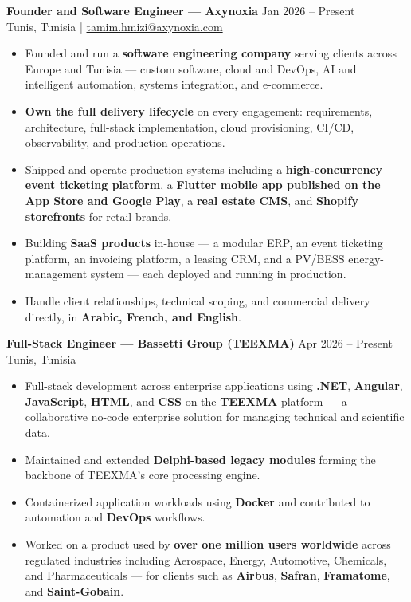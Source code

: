 \documentclass[10pt, letterpaper]{article}
\newenvironment{highlights}{
\begin{itemize}[leftmargin=12pt, itemsep=2pt]
}{
\end{itemize}
}
\begin{document}
\textbf{Founder and Software Engineer --- Axynoxia} \hfill Jan 2026 -- Present \\
Tunis, Tunisia \;|\; \href{mailto:tamim.hmizi@axynoxia.com}{tamim.hmizi@axynoxia.com}
\begin{highlights}
\item Founded and run a \textbf{software engineering company} serving clients across Europe and Tunisia --- custom software, cloud and DevOps, AI and intelligent automation, systems integration, and e-commerce.
\item \textbf{Own the full delivery lifecycle} on every engagement: requirements, architecture, full-stack implementation, cloud provisioning, CI/CD, observability, and production operations.
\item Shipped and operate production systems including a \textbf{high-concurrency event ticketing platform}, a \textbf{Flutter mobile app published on the App Store and Google Play}, a \textbf{real estate CMS}, and \textbf{Shopify storefronts} for retail brands.
\item Building \textbf{SaaS products} in-house --- a modular ERP, an event ticketing platform, an invoicing platform, a leasing CRM, and a PV/BESS energy-management system --- each deployed and running in production.
\item Handle client relationships, technical scoping, and commercial delivery directly, in \textbf{Arabic, French, and English}.
\end{highlights}

\textbf{Full-Stack Engineer --- Bassetti Group (TEEXMA)} \hfill Apr 2026 -- Present \\
Tunis, Tunisia
\begin{highlights}
\item Full-stack development across enterprise applications using \textbf{.NET}, \textbf{Angular}, \textbf{JavaScript}, \textbf{HTML}, and \textbf{CSS} on the \textbf{TEEXMA} platform --- a collaborative no-code enterprise solution for managing technical and scientific data.
\item Maintained and extended \textbf{Delphi-based legacy modules} forming the backbone of TEEXMA's core processing engine.
\item Containerized application workloads using \textbf{Docker} and contributed to automation and \textbf{DevOps} workflows.
\item Worked on a product used by \textbf{over one million users worldwide} across regulated industries including Aerospace, Energy, Automotive, Chemicals, and Pharmaceuticals --- for clients such as \textbf{Airbus}, \textbf{Safran}, \textbf{Framatome}, and \textbf{Saint-Gobain}.
\end{highlights}
\end{document}
